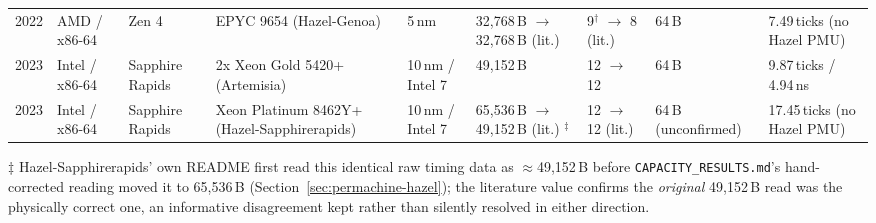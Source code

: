 \documentclass{article}
\newcommand{\cmark}{\ding{51}}
\newcommand{\xmark}{\ding{55}}
\begin{document}
\begin{table}[H]
{\begin{tabularx}{\textwidth}{|l|X|X|X|l|X|X|X|X|}
2022 & AMD / x86-64 & Zen 4 & EPYC 9654 (Hazel-Genoa) & 5\,nm & 32,768\,B $\to$ 32,768\,B (lit.) \cmark & 9$^\dagger$ $\to$ 8 (lit.) & 64\,B & 7.49\,ticks (no Hazel PMU)\\
2023 & Intel / x86-64 & Sapphire Rapids & 2x Xeon Gold 5420+ (Artemisia) & 10\,nm / Intel 7 & 49,152\,B & 12 $\to$ 12 \cmark & 64\,B & 9.87\,ticks / 4.94\,ns\\
2023 & Intel / x86-64 & Sapphire Rapids & Xeon Platinum 8462Y+ (Hazel-Sapphirerapids) & 10\,nm / Intel 7 & 65,536\,B $\to$ 49,152\,B (lit.) \xmark$^\ddagger$ & 12 $\to$ 12 (lit.) \cmark & 64\,B (unconfirmed) & 17.45\,ticks (no Hazel PMU)\\
\hline
\end{tabularx}
}
\end{table}

$\ddagger$ Hazel-Sapphirerapids' own README first read this identical raw timing data as
$\approx$49,152\,B before \texttt{CAPACITY\_RESULTS.md}'s hand-corrected reading moved it to
65,536\,B (Section~\ref{sec:permachine-hazel}); the literature value confirms the
\emph{original} 49,152\,B read was the physically correct one, an informative disagreement
kept rather than silently resolved in either direction.
\end{document}
